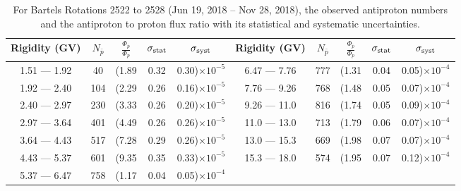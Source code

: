 \begin{table}[p] 
\renewcommand\baselinestretch{1.3}\selectfont
\setlength\tabcolsep{3pt}
\centering
\begin{tabular}{ccccc | ccccc}
\hline
\textbf{Rigidity}  (GV)  & $N_{\bar{p}}$ & $\frac{\Phi_{\bar{p}}}{\Phi_{p}}$ & $\sigma_{\rm{stat}}$ & $\sigma_{\rm{syst}}$ \hspace{1cm}   & \textbf{Rigidity}  (GV)  & $N_{\bar{p}}$ & $\frac{\Phi_{\bar{p}}}{\Phi_{p}}$ & $\sigma_{\rm{stat}}$ & $\sigma_{\rm{syst}}$ \hspace{1cm} \\ 
\hline
1.51 — 1.92   &  40                  &(1.89                          &  0.32              &      0.30)$\times 10^{-5}$  & 6.47 — 7.76                &  777                    &(1.31                                &  0.04                   &      0.05)$\times 10^{-4}$\\
1.92 — 2.40   &  104                &(2.29                          &  0.26              &      0.16)$\times 10^{-5}$  & 7.76 — 9.26                &  768                    &(1.48                                &  0.05                   &      0.07)$\times 10^{-4}$\\
2.40 — 2.97   &  230                &(3.33                          &  0.26              &      0.20)$\times 10^{-5}$  & 9.26 — 11.0                &  816                    &(1.74                                &  0.05                   &      0.09)$\times 10^{-4}$\\    
2.97 — 3.64   &  401                &(4.49                          &  0.26              &      0.26)$\times 10^{-5}$  & 11.0 — 13.0                 &  713                    &(1.79                                &  0.06                   &      0.07)$\times 10^{-4}$\\    
3.64 — 4.43   &  517                &(7.28                          &  0.29              &      0.26)$\times 10^{-5}$  & 13.0 — 15.3               &  669                    &(1.98                                &  0.07                   &      0.07)$\times 10^{-4}$\\
4.43 — 5.37   &  601                &(9.35                          &  0.35              &      0.33)$\times 10^{-5}$  & 15.3 — 18.0               &  574                    &(1.95                                &  0.07                   &      0.12)$\times 10^{-4}$\\
5.37 — 6.47   &  758                &(1.17                          &  0.04              &      0.05)$\times 10^{-4}$  & \\
\hline
\end{tabular}
\caption[Antiproton to proton flux ratio for Bartels Rotations 2522 to 2528]{For Bartels Rotations 2522 to 2528 (Jun 19, 2018 – Nov 28, 2018), the observed antiproton numbers and the antiproton to proton flux ratio with its statistical and systematic uncertainties.}
\label{TableOfDependent17}
\end{table}

